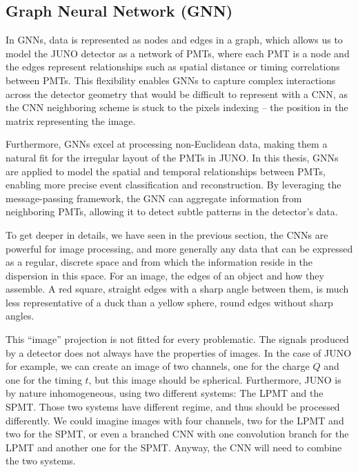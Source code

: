 \documentclass[../main.tex]{subfiles}
\begin{document}
\subsection{Graph Neural Network (GNN)}
\label{sec:ml:gnn}

In GNNs, data is represented as nodes and edges in a graph, which allows us to model the JUNO detector as a network of PMTs, where each PMT is a node and the edges represent relationships such as spatial distance or timing correlations between PMTs. This flexibility enables GNNs to capture complex interactions across the detector geometry that would be difficult to represent with a CNN, as the CNN neighboring scheme is stuck to the pixels indexing -- the position in the matrix representing the image.

Furthermore, GNNs excel at processing non-Euclidean data, making them a natural fit for the irregular layout of the PMTs in JUNO.
In this thesis, GNNs are applied to model the spatial and temporal relationships between PMTs, enabling more precise event classification and reconstruction. By leveraging the message-passing framework, the GNN can aggregate information from neighboring PMTs, allowing it to detect subtle patterns in the detector's data.

To get deeper in details, we have seen in the previous section, the CNNs are powerful for image processing, and more generally any data that can be expressed as a regular, discrete space and from which the information reside in the dispersion in this space. For an image, the edges of an object and how they assemble. A red square, straight edges with a sharp angle between them, is much less representative of a duck than a yellow sphere, round edges without sharp angles.

This ``image'' projection is not fitted for every problematic. The signals produced by a detector does not always have the properties of images. In the case of JUNO for example, we can create an image of two channels, one for the charge $Q$ and one for the timing $t$, but this image should be spherical. Furthermore, JUNO is by nature inhomogeneous, using two different systems: The LPMT and the SPMT. Those two systems have different regime, and thus should be processed differently. We could imagine images with four channels, two for the LPMT and two for the SPMT, or even a branched CNN with one convolution branch for the LPMT and another one for the SPMT. Anyway, the CNN will need to combine the two systems.
\end{document}

